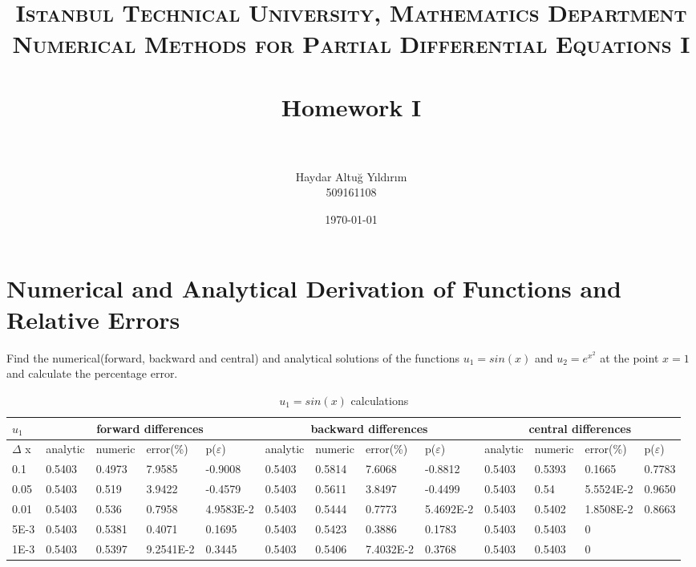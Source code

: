 \documentclass[paper=a4, fontsize=11pt]{scrartcl} %
\title{	
\normalfont \normalsize 
\textsc{Istanbul Technical University, Mathematics Department \\ Numerical Methods for Partial Differential Equations I} \\ [25pt]
\horrule{0.5pt} \\[0.4cm] %
\large Homework I \\ %
\horrule{0.5pt} \\[0.4cm] %
}
\author{Haydar Altu\u{g} Y{\i}ld{\i}r{\i}m \\ 509161108}
\date{\normalsize\today} %
\numberwithin{equation}{section} %
\numberwithin{figure}{section} %
\numberwithin{table}{section} %
\begin{document}
\maketitle %

\section{Numerical and Analytical Derivation of Functions and Relative Errors}

Find the numerical(forward, backward and central) and analytical solutions of the functions $u_1=sin(x)$ and $u_2 = e ^{ {x^ 2}} $ at the point $x=1$ and calculate the percentage error.

\begin{table}[ht]
\centering
\begin{adjustbox}{width=1\textwidth}
\small
\begin{tabular}{ | l | l | l | l | l | l | l | l | l | l | l | l | l | }
\hline
	$u_1$ & \multicolumn{4}{c|}{forward differences}  & \multicolumn{4}{c|}{backward differences} &  \multicolumn{4}{c|}{central differences}   \\ \hline
	$\Delta$ x & analytic & numeric & error(\%) & p($\varepsilon$) & analytic & numeric & error(\%) & p($\varepsilon$) & analytic & numeric & error(\%) & p($\varepsilon$) \\ \hline
	0.1 & 0.5403 & 0.4973 & 7.9585 & -0.9008 & 0.5403 & 0.5814 & 7.6068 & -0.8812 & 0.5403 & 0.5393 & 0.1665 & 0.7783 \\ \hline
	0.05 & 0.5403 & 0.519 & 3.9422 & -0.4579 & 0.5403 & 0.5611 & 3.8497 & -0.4499 & 0.5403 & 0.54 & 5.5524E-2 & 0.9650 \\ \hline
	0.01 & 0.5403 & 0.536 & 0.7958 & 4.9583E-2 & 0.5403 & 0.5444 & 0.7773 & 5.4692E-2 & 0.5403 & 0.5402 & 1.8508E-2 & 0.8663 \\ \hline
	5E-3 & 0.5403 & 0.5381 & 0.4071 & 0.1695 & 0.5403 & 0.5423 & 0.3886 & 0.1783 & 0.5403 & 0.5403 & 0 &  \\ \hline
	1E-3 & 0.5403 & 0.5397 & 9.2541E-2 & 0.3445 & 0.5403 & 0.5406 & 7.4032E-2 & 0.3768 & 0.5403 & 0.5403 & 0 &  \\ \hline
\end{tabular}
\end{adjustbox}
\caption{$u_1 = sin(x)$ calculations}
\end{table} 
\end{document}
